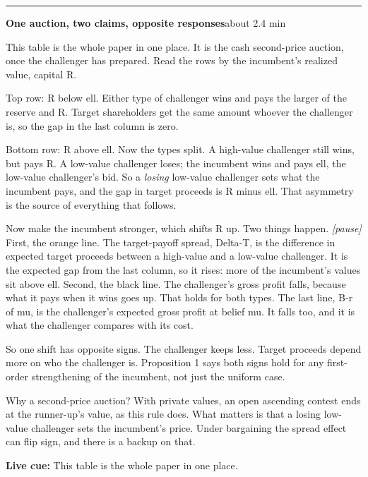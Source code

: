 \documentclass[11pt]{article}
\newcommand{\Pause}{\textcolor{ScriptGray}{\textit{[pause]}}}
\newcommand{\Cue}[1]{\par\nobreak\smallskip\noindent
  \textcolor{ScriptGray}{\footnotesize\textbf{Live cue:} #1}\par}
\newcommand{\scriptframe}[3]{%
  \Needspace{9\baselineskip}%
  \par\medskip\noindent\textcolor{ScriptBlue}{\rule{\linewidth}{0.55pt}}%
  \par\smallskip\noindent
  \textbf{#1}\hfill\textcolor{ScriptGray}{\small #2}\par\smallskip
  #3\par}
\begin{document}
\scriptframe{One auction, two claims, opposite responses}{about 2.4 min}{%
  This table is the whole paper in one place. It is the cash second-price
  auction, once the challenger has prepared. Read the rows by the incumbent's
  realized value, capital R.

  Top row: R below ell. Either type of challenger wins and pays the larger of
  the reserve and R. Target shareholders get the same amount whoever the
  challenger is, so the gap in the last column is zero.

  Bottom row: R above ell. Now the types split. A high-value challenger still
  wins, but pays R. A low-value challenger loses; the incumbent wins and pays
  ell, the low-value challenger's bid. So a \emph{losing} low-value challenger
  sets what the incumbent pays, and the gap in target proceeds is R minus ell.
  That asymmetry is the source of everything that follows.

  Now make the incumbent stronger, which shifts R up. Two things happen.
  \Pause{} First, the orange line. The target-payoff spread, Delta-T, is the
  difference in expected target proceeds between a high-value and a low-value
  challenger. It is the expected gap from the last column, so it rises: more of
  the incumbent's values sit above ell. Second, the black line. The challenger's
  gross profit falls, because what it pays when it wins goes up. That holds for
  both types. The last line, B-r of mu, is the challenger's expected gross
  profit at belief mu. It falls too, and it is what the challenger compares
  with its cost.

  So one shift has opposite signs. The challenger keeps less. Target proceeds
  depend more on who the challenger is. Proposition 1 says both signs hold for
  any first-order strengthening of the incumbent, not just the uniform case.

  Why a second-price auction? With private values, an open ascending contest
  ends at the runner-up's value, as this rule does. What matters is that a
  losing low-value challenger sets the incumbent's price. Under bargaining the
  spread effect can flip sign, and there is a backup on that.
  \Cue{This table is the whole paper in one place.}
}
\end{document}
